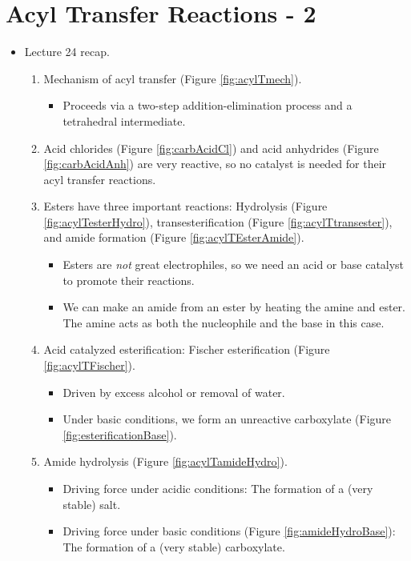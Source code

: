\documentclass[../notes.tex]{subfiles}
\begin{document}
\section{Acyl Transfer Reactions - 2}
\begin{itemize}
    \item {}Lecture 24 recap.
    \begin{enumerate}
        \item Mechanism of acyl transfer (Figure \ref{fig:acylTmech}).
        \begin{itemize}
            \item Proceeds via a two-step addition-elimination process and a tetrahedral intermediate.
        \end{itemize}
        \item Acid chlorides (Figure \ref{fig:carbAcidCl}) and acid anhydrides (Figure \ref{fig:carbAcidAnh}) are very reactive, so no catalyst is needed for their acyl transfer reactions.
        \item Esters have three important reactions: Hydrolysis (Figure \ref{fig:acylTesterHydro}), transesterification (Figure \ref{fig:acylTtransester}), and amide formation (Figure \ref{fig:acylTEsterAmide}).
        \begin{itemize}
            \item Esters are \emph{not} great electrophiles, so we need an acid or base catalyst to promote their reactions.
            \item We can make an amide from an ester by heating the amine and ester. The amine acts as both the nucleophile and the base in this case.
        \end{itemize}
        \item Acid catalyzed esterification: Fischer esterification (Figure \ref{fig:acylTFischer}).
        \begin{itemize}
            \item Driven by excess alcohol or removal of water.
            \item Under basic conditions, we form an unreactive carboxylate (Figure \ref{fig:esterificationBase}).
        \end{itemize}
        \item Amide hydrolysis (Figure \ref{fig:acylTamideHydro}).
        \begin{itemize}
            \item Driving force under acidic conditions: The formation of a (very stable) salt.
            \item Driving force under basic conditions (Figure \ref{fig:amideHydroBase}): The formation of a (very stable) carboxylate.

\end{itemize}
\end{enumerate}
\end{itemize}
\end{document}
